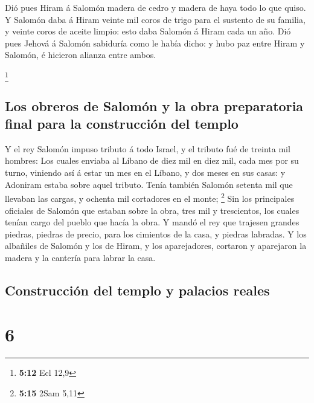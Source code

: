  Dió pues Hiram á Salomón madera de cedro y madera de haya
todo lo que quiso.  Y Salomón daba á Hiram veinte mil coros
de trigo para el sustento de su familia, y veinte coros de aceite
limpio: esto daba Salomón á Hiram cada un año.  Dió pues
Jehová á Salomón sabiduría como le había dicho: y hubo paz entre Hiram y
Salomón, é hicieron alianza entre ambos.

\footnote{\textbf{5:12} Ecl 12,9}

\hypertarget{los-obreros-de-salomuxf3n-y-la-obra-preparatoria-final-para-la-construcciuxf3n-del-templo}{%
\subsection{Los obreros de Salomón y la obra preparatoria final para la
construcción del
templo}\label{los-obreros-de-salomuxf3n-y-la-obra-preparatoria-final-para-la-construcciuxf3n-del-templo}}

 Y el rey Salomón impuso tributo á todo Israel, y el
tributo fué de treinta mil hombres:  Los cuales enviaba al
Líbano de diez mil en diez mil, cada mes por su turno, viniendo así á
estar un mes en el Líbano, y dos meses en sus casas: y Adoniram estaba
sobre aquel tributo.  Tenía también Salomón setenta mil que
llevaban las cargas, y ochenta mil cortadores en el monte; \footnote{\textbf{5:15}
  2Sam 5,11}  Sin los principales oficiales de Salomón que
estaban sobre la obra, tres mil y trescientos, los cuales tenían cargo
del pueblo que hacía la obra.  Y mandó el rey que trajesen
grandes piedras, piedras de precio, para los cimientos de la casa, y
piedras labradas.  Y los albañiles de Salomón y los de
Hiram, y los aparejadores, cortaron y aparejaron la madera y la cantería
para labrar la casa.

\hypertarget{construcciuxf3n-del-templo-y-palacios-reales}{%
\subsection{Construcción del templo y palacios
reales}\label{construcciuxf3n-del-templo-y-palacios-reales}}

\hypertarget{section-5}{%
\section{6}\label{section-5}}

